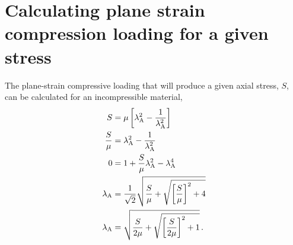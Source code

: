 \documentclass[10pt,letterpaper,oneside]{report}
\newcommand{\scas}[1]{\mbox{{\scriptsize{${\rm{#1}}$}}}{}}
\begin{document}
\section{Calculating plane strain compression loading for a given stress}
The plane-strain compressive loading that will produce a given axial stress, $S$, can be calculated for an incompressible material,
\begin{align}
S &= \mu \left[ \lambda_{\scas{A}}^2 - \frac{1}{\lambda_{\scas{A}}^2 } \right] \\
\frac{S}{\mu} &= \lambda_{\scas{A}}^2 - \frac{1}{\lambda_{\scas{A}}^2 } \\
0 &= 1 + \frac{S}{\mu} \lambda_{\scas{A}}^2 - \lambda_{\scas{A}}^4 \\
\lambda_{\scas{A}} &= \frac{1}{\sqrt{2}} \sqrt{ \frac{S}{\mu} + \sqrt{ \left[ \frac{S}{\mu} \right]^2 + 4 } } \\
\lambda_{\scas{A}} &= \sqrt{ \frac{S}{2 \mu} + \sqrt{ \left[ \frac{S}{ 2 \mu} \right] ^2 + 1 } }  \, .
\end{align}


\printbibliography[heading=bibintoc]
\end{document}
